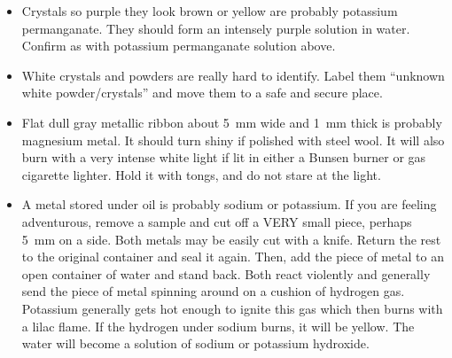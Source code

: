 \begin{itemize}
\item{Crystals so purple they look brown or yellow 
are probably potassium permanganate. 
They should form an intensely purple solution in water. 
Confirm as with potassium permanganate solution above.}

\item{White crystals and powders are really hard to identify. 
Label them ``unknown white powder/crystals'' 
and move them to a safe and secure place.}

\item{Flat dull gray metallic ribbon about 5~mm wide 
and 1~mm thick is probably magnesium metal. 
It should turn shiny if polished with steel wool. 
It will also burn with a very intense white light 
if lit in either a Bunsen burner or gas cigarette lighter. 
Hold it with tongs, 
and do not stare at the light.}

\item{A metal stored under oil is probably sodium or potassium. 
If you are feeling adventurous, 
remove a sample and cut off a VERY small piece, 
perhaps 5~mm on a side. 
Both metals may be easily cut with a knife. 
Return the rest to the original container and seal it again. 
Then, 
add the piece of metal to an open container of water and stand back. 
Both react violently and generally send the piece of metal 
spinning around on a cushion of hydrogen gas. 
Potassium generally gets hot enough to ignite this gas 
which then burns with a lilac flame. 
If the hydrogen under sodium burns, 
it will be yellow. 
The water will become a solution of sodium or potassium hydroxide.}

\end{itemize}
